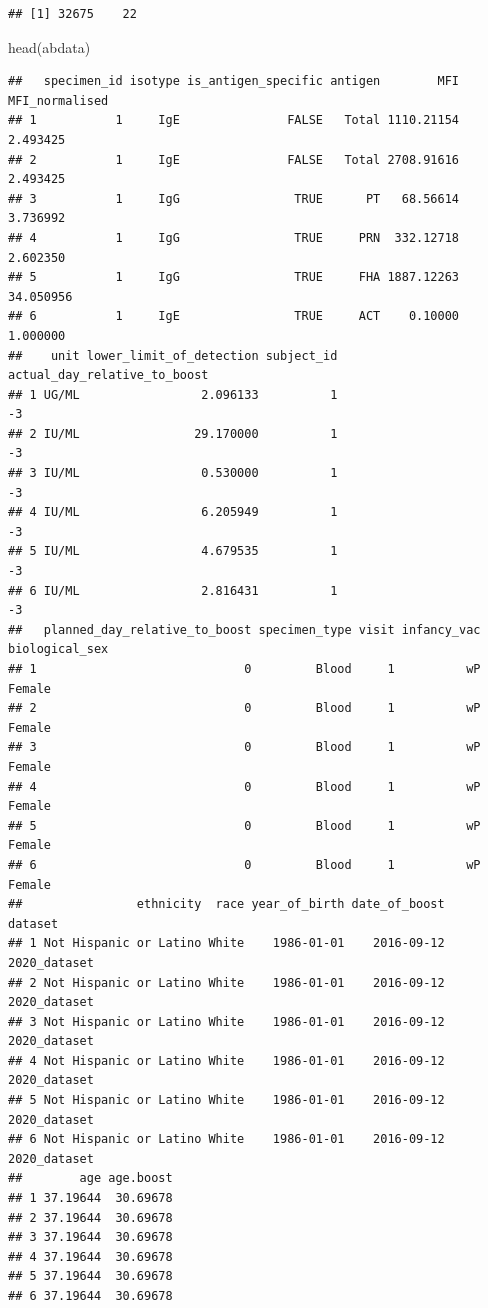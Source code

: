 \documentclass[
]{article}
\newenvironment{Shaded}{\begin{snugshade}}{\end{snugshade}}
\newcommand{\FunctionTok}[1]{\textcolor[rgb]{0.00,0.00,0.00}{#1}}
\newcommand{\NormalTok}[1]{#1}
\begin{document}
\begin{verbatim}
## [1] 32675    22
\end{verbatim}

\begin{Shaded}
\begin{Highlighting}[]
\FunctionTok{head}\NormalTok{(abdata)}
\end{Highlighting}
\end{Shaded}

\begin{verbatim}
##   specimen_id isotype is_antigen_specific antigen        MFI MFI_normalised
## 1           1     IgE               FALSE   Total 1110.21154       2.493425
## 2           1     IgE               FALSE   Total 2708.91616       2.493425
## 3           1     IgG                TRUE      PT   68.56614       3.736992
## 4           1     IgG                TRUE     PRN  332.12718       2.602350
## 5           1     IgG                TRUE     FHA 1887.12263      34.050956
## 6           1     IgE                TRUE     ACT    0.10000       1.000000
##    unit lower_limit_of_detection subject_id actual_day_relative_to_boost
## 1 UG/ML                 2.096133          1                           -3
## 2 IU/ML                29.170000          1                           -3
## 3 IU/ML                 0.530000          1                           -3
## 4 IU/ML                 6.205949          1                           -3
## 5 IU/ML                 4.679535          1                           -3
## 6 IU/ML                 2.816431          1                           -3
##   planned_day_relative_to_boost specimen_type visit infancy_vac biological_sex
## 1                             0         Blood     1          wP         Female
## 2                             0         Blood     1          wP         Female
## 3                             0         Blood     1          wP         Female
## 4                             0         Blood     1          wP         Female
## 5                             0         Blood     1          wP         Female
## 6                             0         Blood     1          wP         Female
##                ethnicity  race year_of_birth date_of_boost      dataset
## 1 Not Hispanic or Latino White    1986-01-01    2016-09-12 2020_dataset
## 2 Not Hispanic or Latino White    1986-01-01    2016-09-12 2020_dataset
## 3 Not Hispanic or Latino White    1986-01-01    2016-09-12 2020_dataset
## 4 Not Hispanic or Latino White    1986-01-01    2016-09-12 2020_dataset
## 5 Not Hispanic or Latino White    1986-01-01    2016-09-12 2020_dataset
## 6 Not Hispanic or Latino White    1986-01-01    2016-09-12 2020_dataset
##        age age.boost
## 1 37.19644  30.69678
## 2 37.19644  30.69678
## 3 37.19644  30.69678
## 4 37.19644  30.69678
## 5 37.19644  30.69678
## 6 37.19644  30.69678
\end{verbatim}
\end{document}
